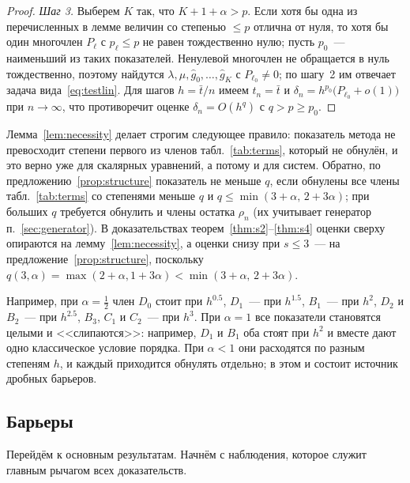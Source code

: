 \documentclass[11pt,a4paper]{article}
\theoremstyle{plain}
\theoremstyle{definition}
\begin{document}
\begin{proof}
\emph{Шаг 3.} Выберем $K$ так, что $K+1+\alpha>p$. Если хотя бы одна из перечисленных в лемме величин со степенью $\le p$ отлична от нуля, то хотя бы один многочлен $P_\ell$ с $p_\ell\le p$ не равен тождественно нулю; пусть $p_0$~--- наименьший из таких показателей. Ненулевой многочлен не обращается в нуль тождественно, поэтому найдутся $\lambda,\mu,\hat g_0,\dots,\hat g_K$ с $P_{\ell_0}\ne0$; по шагу~2 им отвечает задача вида~\eqref{eq:testlin}. Для шагов $h=\bar t/n$ имеем $t_n=\bar t$ и $\delta_n=h^{p_0}\bigl(P_{\ell_0}+o(1)\bigr)$ при $n\to\infty$, что противоречит оценке $\delta_n=O(h^q)$ с $q>p\ge p_0$.
\end{proof}

Лемма~\ref{lem:necessity} делает строгим следующее правило: показатель метода не превосходит степени первого из членов табл.~\ref{tab:terms}, который не обнулён, и это верно уже для скалярных уравнений, а потому и для систем. Обратно, по предложению~\ref{prop:structure} показатель не меньше $q$, если обнулены все члены табл.~\ref{tab:terms} со степенями меньше $q$ и $q\le\min(3+\alpha,\,2+3\alpha)$; при больших $q$ требуется обнулить и члены остатка $\rho_n$ (их учитывает генератор п.~\ref{sec:generator}). В доказательствах теорем~\ref{thm:s2}--\ref{thm:s4} оценки сверху опираются на лемму~\ref{lem:necessity}, а оценки снизу при $s\le3$~--- на предложение~\ref{prop:structure}, поскольку $q(3,\alpha)=\max(2+\alpha,1+3\alpha)<\min(3+\alpha,\,2+3\alpha)$.

Например, при $\alpha=\frac12$ член $D_0$ стоит при $h^{0.5}$, $D_1$~--- при $h^{1.5}$, $B_1$~--- при $h^{2}$, $D_2$ и $B_2$~--- при $h^{2.5}$, $B_3$, $C_1$ и $C_2$~--- при $h^{3}$. При $\alpha=1$ все показатели становятся целыми и <<слипаются>>: например, $D_1$ и $B_1$ оба стоят при $h^2$ и вместе дают одно классическое условие порядка. При $\alpha<1$ они расходятся по разным степеням $h$, и каждый приходится обнулять отдельно; в этом и состоит источник дробных барьеров.

\subsection{Барьеры}

Перейдём к основным результатам. Начнём с наблюдения, которое служит главным рычагом всех доказательств.
\end{document}

